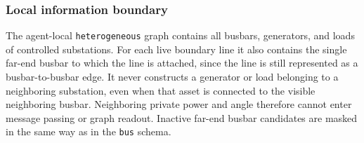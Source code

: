 \subsubsection{Local information boundary}

The agent-local \texttt{heterogeneous} graph contains all busbars, generators,
and loads of controlled substations. For each live boundary line it also
contains the single far-end busbar to which the line is attached, since the
line is still represented as a busbar-to-busbar edge. It never constructs a
generator or load belonging to a neighboring substation, even when that asset
is connected to the visible neighboring busbar. Neighboring private power and
angle therefore cannot enter message passing or graph readout. Inactive
far-end busbar candidates are masked in the same way as in the \texttt{bus}
schema.

